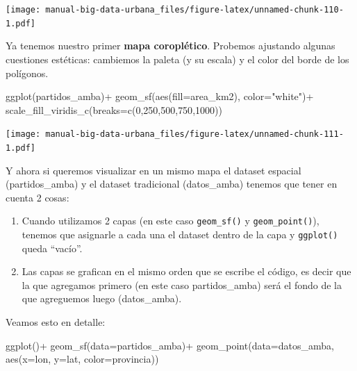 \documentclass[
  spanish,
]{book}
\newenvironment{Shaded}{\begin{snugshade}}{\end{snugshade}}
\newcommand{\AttributeTok}[1]{\textcolor[rgb]{0.77,0.63,0.00}{#1}}
\newcommand{\DecValTok}[1]{\textcolor[rgb]{0.00,0.00,0.81}{#1}}
\newcommand{\FunctionTok}[1]{\textcolor[rgb]{0.00,0.00,0.00}{#1}}
\newcommand{\NormalTok}[1]{#1}
\newcommand{\SpecialCharTok}[1]{\textcolor[rgb]{0.00,0.00,0.00}{#1}}
\newcommand{\StringTok}[1]{\textcolor[rgb]{0.31,0.60,0.02}{#1}}
\begin{document}
\texttt{[image: manual-big-data-urbana\_files/figure-latex/unnamed-chunk-110-1.pdf]}

Ya tenemos nuestro primer \textbf{mapa coroplético}. Probemos ajustando algunas cuestiones estéticas: cambiemos la paleta (y su escala) y el color del borde de los polígonos.

\begin{Shaded}
\begin{Highlighting}[]
\FunctionTok{ggplot}\NormalTok{(partidos\_amba)}\SpecialCharTok{+}
  \FunctionTok{geom\_sf}\NormalTok{(}\FunctionTok{aes}\NormalTok{(}\AttributeTok{fill=}\NormalTok{area\_km2), }\AttributeTok{color=}\StringTok{"white"}\NormalTok{)}\SpecialCharTok{+}
  \FunctionTok{scale\_fill\_viridis\_c}\NormalTok{(}\AttributeTok{breaks=}\FunctionTok{c}\NormalTok{(}\DecValTok{0}\NormalTok{,}\DecValTok{250}\NormalTok{,}\DecValTok{500}\NormalTok{,}\DecValTok{750}\NormalTok{,}\DecValTok{1000}\NormalTok{))}
\end{Highlighting}
\end{Shaded}

\texttt{[image: manual-big-data-urbana\_files/figure-latex/unnamed-chunk-111-1.pdf]}

Y ahora si queremos visualizar en un mismo mapa el dataset espacial (partidos\_amba) y el dataset tradicional (datos\_amba) tenemos que tener en cuenta 2 cosas:

\begin{enumerate}
\def\labelenumi{\arabic{enumi}.}
\item
  Cuando utilizamos 2 capas (en este caso \texttt{geom\_sf()} y \texttt{geom\_point()}), tenemos que asignarle a cada una el dataset dentro de la capa y \texttt{ggplot()} queda ``vacío''.
\item
  Las capas se grafican en el mismo orden que se escribe el código, es decir que la que agregamos primero (en este caso partidos\_amba) será el fondo de la que agreguemos luego (datos\_amba).
\end{enumerate}

Veamos esto en detalle:

\begin{Shaded}
\begin{Highlighting}[]
\FunctionTok{ggplot}\NormalTok{()}\SpecialCharTok{+}
  \FunctionTok{geom\_sf}\NormalTok{(}\AttributeTok{data=}\NormalTok{partidos\_amba)}\SpecialCharTok{+}
  \FunctionTok{geom\_point}\NormalTok{(}\AttributeTok{data=}\NormalTok{datos\_amba, }\FunctionTok{aes}\NormalTok{(}\AttributeTok{x=}\NormalTok{lon, }\AttributeTok{y=}\NormalTok{lat, }\AttributeTok{color=}\NormalTok{provincia))}
\end{Highlighting}
\end{Shaded}
\end{document}
